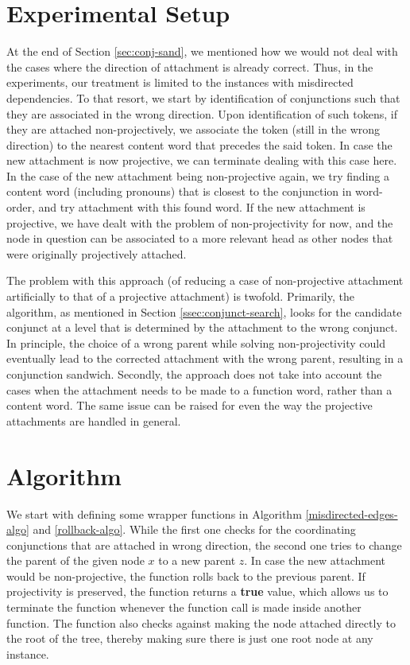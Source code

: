 \section{Experimental Setup}
\label{ssec:conj_head_experiment}

At the end of Section \ref{sec:conj-sand}, we mentioned how we would not deal with the cases where the direction of attachment is already correct. Thus, in the experiments, our treatment is limited to the instances with misdirected dependencies. To that resort, we start by identification of conjunctions such that they are associated in the wrong direction. Upon identification of such tokens, if they are attached non-projectively, we associate the token (still in the wrong direction) to the nearest content word that precedes the said token. In case the new attachment is now projective, we can terminate dealing with this case here. In the case of the new attachment being non-projective again, we try finding a content word (including pronouns) that is closest to the conjunction in word-order, and try attachment with this found word. If the new attachment is projective, we have dealt with the problem of non-projectivity for now, and the node in question can be associated to a more relevant head as other nodes that were originally projectively attached.

The problem with this approach (of reducing a case of non-projective attachment artificially to that of a projective attachment) is twofold. Primarily, the algorithm, as mentioned in Section \ref{ssec:conjunct-search}, looks for the candidate conjunct at a level that is determined by the attachment to the wrong conjunct. In principle, the choice of a wrong parent while solving non-projectivity could eventually lead to the corrected attachment with the wrong parent, resulting in a conjunction sandwich. Secondly, the approach does not take into account the cases when the attachment needs to be made to a function word, rather than a content word. The same issue can be raised for even the way the projective attachments are handled in general.

\section{Algorithm}
\label{ssec:conj_head_algorithm}

We start with defining some wrapper functions in Algorithm \ref{misdirected-edges-algo} and \ref{rollback-algo}. While the first one checks for the coordinating conjunctions that are attached in wrong direction, the second one tries to change the parent of the given node \(x\) to a new parent \(z\). In case the new attachment would be non-projective, the function rolls back to the previous parent. If projectivity is preserved, the function returns a \textbf{true} value, which allows us to terminate the function whenever the function call is made inside another function. The function also checks against making the node attached directly to the root of the tree, thereby making sure there is just one root node at any instance.

